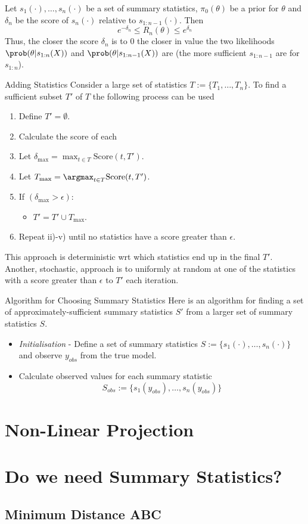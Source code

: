 \documentclass[11pt,a4paper]{article}
\begin{document}
  \begin{theorem}{}
    Let $s_{1}(\cdot),\dots,s_n(\cdot)$ be a set of summary statistics, $\pi_0(\theta)$ be a prior for $\theta$ and $\delta_n$ be the score of $s_n(\cdot)$ relative to $s_{1:n-1}(\cdot)$. Then
    \[ e^{-\delta_n}\leq R_n(\theta)\leq e^{\delta_n} \]
    Thus, the closer the score $\delta_n$ is to $0$ the closer in value the two likelihoods $\prob(\theta|s_{1:n}(X))$ and  $\prob(\theta|s_{1:n-1}(X))$ are (the more sufficient $s_{1:n-1}$ are for $s_{1:n}$).
  \end{theorem}

  \begin{remark}{Adding Statistics}
    Consider a large set of statistics $T:=\{T_1,\dots,T_n\}$. To find a sufficient subset $T'$ of $T$ the following process can be used
    \begin{enumerate}
      \item Define $T'=\emptyset$.
      \item Calculate the score of each
      \item Let $\delta_\text{max}=\max_{t\in T}\text{Score}(t,T')$.
      \item Let $T_\text{max}=\argmax_{t\in T}\text{Score}(t,T')$.
      \item If $(\delta_\text{max}>\epsilon)$:
      \begin{itemize}
        \item $T'=T'\cup T_\text{max}$.
      \end{itemize}
      \item Repeat ii)-v) until no statistics have a score greater than $\epsilon$.
    \end{enumerate}
    This approach is deterministic wrt which statistics end up in the final $T'$. Another, stochastic, approach is to uniformly at random at one of the statistics with a score greater than $\epsilon$ to $T'$ each iteration.
  \end{remark}

  \begin{proposition}{Algorithm for Choosing Summary Statistics}
    Here is an algorithm for finding a set of approximately-sufficient summary statistics $S'$ from a larger set of summary statistics $S$.
    \begin{itemize}
      \item \textit{Initialisation} - Define a set of summary statistics $S:=\{s_1(\cdot),\dots,s_n(\cdot)\}$ and observe $y_{obs}$ from the true model.
      \item Calculate observed values for each summary statistic
      \[ S_{obs}:=\{s_1(y_{obs}),\dots,s_n(y_{obs})\} \]
    \end{itemize}
  \end{proposition}

\section{Non-Linear Projection}

\section{Do we need Summary Statistics?}

\subsection{Minimum Distance ABC}

\newpage


\end{document}
